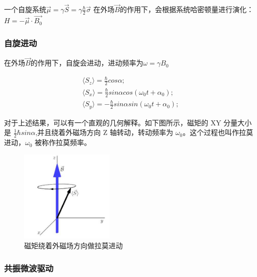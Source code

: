 \documentclass[a4paper,UTF8]{ctexart}
\begin{document}
一个自旋系统$\vec\mu=\gamma\vec{S}=\gamma\frac{\hbar}{2}\vec{\sigma}$
在外场$\vec B$的作用下，会根据系统哈密顿量进行演化：$H=-\vec{\mu}\cdot\vec{B_0}$

\subsubsection{自旋进动}

在外场$\vec B$的作用下，自旋会进动，进动频率为$\omega=\gamma B_0$

\begin{equation}\begin{gathered}
\langle S_z\rangle=\frac{\hbar}{2}cos\alpha; \\
\langle S_{x}\rangle=\frac{\hbar}{2}sin\alpha cos(\omega_{0}t+\alpha_{0}); \\
\langle S_{y}\rangle=-\frac{\hbar}{2}sin\alpha sin(\omega_{0}t+\alpha_{0}); 
\end{gathered}\end{equation}

对于上述结果，可以有一个直观的几何解释。如下图所示，磁矩的 XY 分量大小是 $\frac12\hbar sin\alpha$,并且绕着外磁场方向 Z 轴转动，转动频率为 $\omega_0$。这个过程也叫作拉莫进动，$\omega_0$ 被称作拉莫频率。

\begin{figure}[H]
    \centering
    \begin{minipage}[b]{0.9\textwidth}
        \centering
        \includegraphics[width=0.4\textwidth]{./fig8.jpg}
        \caption{磁矩绕着外磁场方向做拉莫进动}
    \end{minipage}
\end{figure}

\subsubsection{共振微波驱动}
\end{document}
